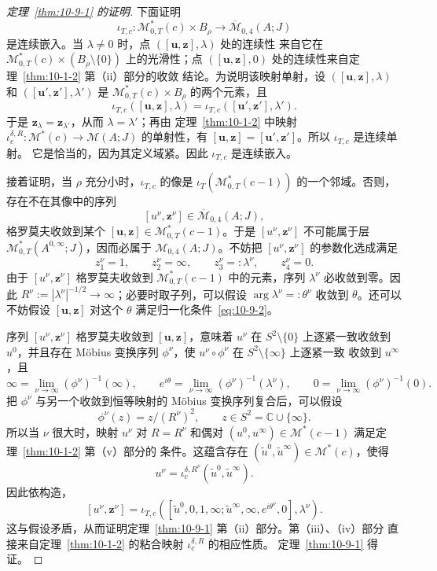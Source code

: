 \begin{proof}[定理~\ref{thm:10-9-1} 的证明]
下面证明
\[
  \iota_{T,c}:\mathcal M_{0,T}^*(c)\times B_\rho
  \longrightarrow\overline{\mathcal M}_{0,4}(A;J)
\]
是连续嵌入。当 $\lambda\ne0$ 时，点 $([\mathbf u,\mathbf z],\lambda)$ 处的连续性
来自它在 $\mathcal M_{0,T}^*(c)\times(B_\rho\setminus\{0\})$ 上的光滑性；点
$([\mathbf u,\mathbf z],0)$ 处的连续性来自定理~\ref{thm:10-1-2} 第（ii）部分的收敛
结论。为说明该映射单射，设
$([\mathbf u,\mathbf z],\lambda)$ 和
$([\mathbf u',\mathbf z'],\lambda')$ 是
$\mathcal M_{0,T}^*(c)\times B_\rho$ 的两个元素，且
\[
  \iota_{T,c}([\mathbf u,\mathbf z],\lambda)
  =\iota_{T,c}([\mathbf u',\mathbf z'],\lambda').
\]
于是 $\mathbf z_\lambda=\mathbf z_{\lambda'}$，从而 $\lambda=\lambda'$；再由
定理~\ref{thm:10-1-2} 中映射
$\iota_c^{\delta,R}:\mathcal M^*(c)\to\mathcal M(A;J)$ 的单射性，有
$[\mathbf u,\mathbf z]=[\mathbf u',\mathbf z']$。所以 $\iota_{T,c}$ 是连续单射。
它是恰当的，因为其定义域紧。因此 $\iota_{T,c}$ 是连续嵌入。

接着证明，当 $\rho$ 充分小时，$\iota_{T,c}$ 的像是
$\iota_T(\mathcal M_{0,T}^*(c-1))$ 的一个邻域。否则，存在不在其像中的序列
\[
  [u^\nu,\mathbf z^\nu]\in\overline{\mathcal M}_{0,4}(A;J),
\]
格罗莫夫收敛到某个
$[\mathbf u,\mathbf z]\in\mathcal M_{0,T}^*(c-1)$。于是
$[u^\nu,\mathbf z^\nu]$ 不可能属于层
$\mathcal M_{0,T}^*(A^{0,\infty};J)$，因而必属于
$\mathcal M_{0,4}(A;J)$。不妨把 $[u^\nu,\mathbf z^\nu]$ 的参数化选成满足
\[
  z_1^\nu=1,\qquad z_2^\nu=\infty,\qquad
  z_3^\nu=: \lambda^\nu,\qquad z_4^\nu=0.
\]
由于 $[u^\nu,\mathbf z^\nu]$ 格罗莫夫收敛到
$\mathcal M_{0,T}^*(c-1)$ 中的元素，序列 $\lambda^\nu$ 必收敛到零。因此
$R^\nu:=|\lambda^\nu|^{-1/2}\to\infty$；必要时取子列，可以假设
$\arg\lambda^\nu=: \theta^\nu$ 收敛到 $\theta$。还可以不妨假设
$[\mathbf u,\mathbf z]$ 对这个 $\theta$ 满足归一化条件~\eqref{eq:10-9-2}。

序列 $[u^\nu,\mathbf z^\nu]$ 格罗莫夫收敛到 $[\mathbf u,\mathbf z]$，意味着
$u^\nu$ 在 $S^2\setminus\{0\}$ 上逐紧一致收敛到 $u^0$，并且存在 Möbius 变换序列
$\phi^\nu$，使 $u^\nu\circ\phi^\nu$ 在 $S^2\setminus\{\infty\}$ 上逐紧一致
收敛到 $u^\infty$，且
\[
  \infty=\lim_{\nu\to\infty}(\phi^\nu)^{-1}(\infty),
  \qquad e^{i\theta}=\lim_{\nu\to\infty}(\phi^\nu)^{-1}(\lambda^\nu),
  \qquad 0=\lim_{\nu\to\infty}(\phi^\nu)^{-1}(0).
\]
把 $\phi^\nu$ 与另一个收敛到恒等映射的 Möbius 变换序列复合后，可以假设
\[
  \phi^\nu(z)=z/(R^\nu)^2,
  \qquad z\in S^2=\mathbb C\cup\{\infty\}.
\]
所以当 $\nu$ 很大时，映射 $u^\nu$ 对 $R=R^\nu$ 和偶对
$(u^0,u^\infty)\in\mathcal M^*(c-1)$ 满足定理~\ref{thm:10-1-2} 第（v）部分的
条件。这蕴含存在
$(\widetilde u^0,\widetilde u^\infty)\in\mathcal M^*(c)$，使得
\[
  u^\nu=\iota_c^{\delta,R^\nu}(\widetilde u^0,\widetilde u^\infty).
\]
因此依构造，
\[
  [u^\nu,\mathbf z^\nu]
  =\iota_{T,c}
  ([\widetilde u^0,0,1,\infty;
     \widetilde u^\infty,\infty,e^{i\theta^\nu},0],\lambda^\nu).
\]
这与假设矛盾，从而证明定理~\ref{thm:10-9-1} 第（ii）部分。第（iii）、（iv）部分
直接来自定理~\ref{thm:10-1-2} 的粘合映射 $\iota_c^{\delta,R}$ 的相应性质。
定理~\ref{thm:10-9-1} 得证。
\end{proof}


